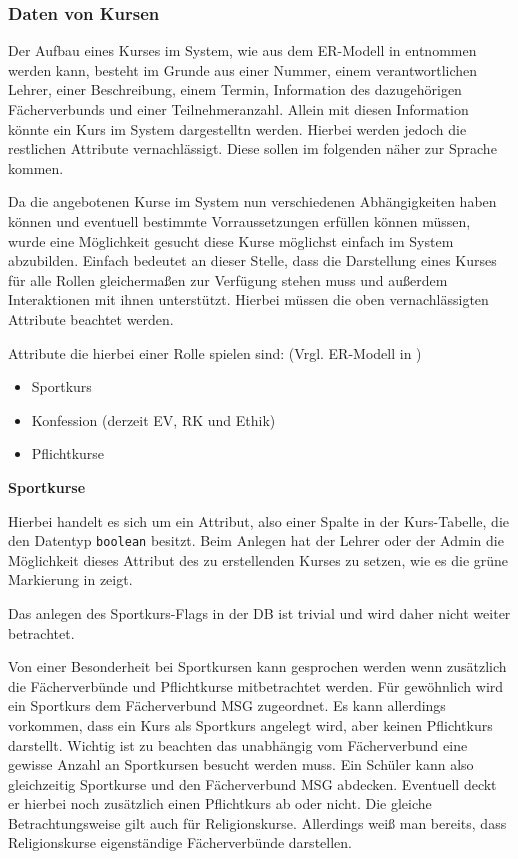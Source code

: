 \subsubsection{Daten von Kursen}

Der Aufbau eines Kurses im System, wie aus dem ER-Modell in  entnommen werden kann, besteht im Grunde aus einer Nummer, einem verantwortlichen Lehrer, einer Beschreibung, einem Termin, Information des dazugehörigen Fächerverbunds  und einer Teilnehmeranzahl. Allein mit diesen Information könnte ein Kurs im System dargestelltn werden. Hierbei werden jedoch die restlichen Attribute vernachlässigt. Diese sollen im folgenden näher zur Sprache kommen.  

Da die angebotenen Kurse im System nun verschiedenen Abhängigkeiten haben können und eventuell bestimmte Vorraussetzungen erfüllen können müssen, wurde eine Möglichkeit gesucht diese Kurse möglichst einfach im System abzubilden. 
Einfach bedeutet an dieser Stelle, dass die Darstellung eines Kurses für alle Rollen gleichermaßen zur Verfügung stehen muss und außerdem Interaktionen mit ihnen unterstützt.
Hierbei müssen die oben vernachlässigten Attribute beachtet werden. 

Attribute die hierbei einer Rolle spielen sind: (Vrgl. ER-Modell in )
\begin{itemize}
  \item Sportkurs
  \item Konfession (derzeit EV, RK und Ethik)
  \item Pflichtkurse
\end{itemize}

\textbf{Sportkurse}

Hierbei handelt es sich um ein Attribut, also einer Spalte in der Kurs-Tabelle, die den Datentyp \texttt{boolean} besitzt.
Beim Anlegen hat der Lehrer oder der Admin die Möglichkeit dieses Attribut des zu erstellenden Kurses zu setzen, wie es die grüne Markierung in  zeigt.

Das anlegen des Sportkurs-Flags in der DB ist trivial und wird daher nicht weiter betrachtet.

Von einer Besonderheit bei Sportkursen kann gesprochen werden wenn zusätzlich die Fächerverbünde und Pflichtkurse mitbetrachtet werden.
Für gewöhnlich wird ein Sportkurs dem Fächerverbund \ac{MSG} zugeordnet. Es kann allerdings vorkommen, dass ein Kurs als Sportkurs angelegt wird, aber keinen Pflichtkurs darstellt.  
Wichtig ist zu beachten das unabhängig vom Fächerverbund eine gewisse Anzahl an Sportkursen besucht werden muss. Ein Schüler kann also gleichzeitig Sportkurse und den Fächerverbund \ac{MSG} abdecken. Eventuell deckt er hierbei noch zusätzlich einen Pflichtkurs ab oder nicht.
Die gleiche Betrachtungsweise gilt auch für Religionskurse. Allerdings weiß man bereits, dass Religionskurse eigenständige Fächerverbünde darstellen.

